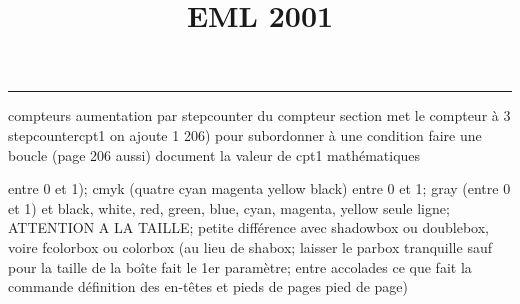 \documentclass[11pt]{article}%
\title{\bf \vspace{-2cm} EML 2001} %
\author{} %
\date{} %
\renewcommand{\headrulewidth}{0pt}%
\renewcommand{\footrulewidth}{0.4pt}%
\begin{document}
\maketitle %
\vspace{-1.4cm}\hrule %
\thispagestyle{fancy}

\vspace*{.2cm}



compteurs%
aumentation par stepcounter du compteur section%
met le compteur à 3%
stepcounter{cpt1} on ajoute 1%
206) pour subordonner à une condition %
faire une boucle (page 206 aussi) %
document la valeur de cpt1 
mathématiques\newcommand{\ch}{\operatorname{ch}} 
\newcommand{\sh}{\operatorname{sh}}
\renewcommand{\tanh}{\operatorname{th}}
\renewcommand{\sinh}{\operatorname{sh}}
\renewcommand{\cosh}{\operatorname{ch}}
\newcommand{\argsh}{\operatorname{argsh}}
\newcommand{\argch}{\operatorname{argch}}
\newcommand{\argth}{\operatorname{argth}}
\newcommand{\ker}{\operatorname{Ker}}
\renewcommand{\im}{\operatorname{Im}}
\newcommand{\rg}{\operatorname{rg}}
\newcommand{\Id}{\operatorname{Id}}
\newcommand{\id}{\operatorname{id}}
\renewcommand{\leq}{\leq}
\renewcommand{\geq}{\geq }

entre 0 et 1); cmyk (quatre cyan magenta yellow black) entre 0 et 1;
gray (entre 0 et 1) et black, white, red, green, blue, cyan, magenta,
yellow%
seule ligne; ATTENTION A LA TAILLE; petite différence avec shadowbox ou
doublebox, voire fcolorbox ou colorbox (au lieu de shabox; laisser le
parbox tranquille sauf pour la taille de la boîte
\newcommand{\Tbox}[1]{\begin{center} \shabox{\parbox{0.6
\linewidth}{#1}} \end{center}} %
fait le 1er paramètre; entre accolades ce que fait la commande
définition des en-têtes et pieds de pages\pagestyle{fancy}
\chead{}
\rfoot[ \ \thepage]{\thepage}
\cfoot{}
\lfoot{}
\thispagestyle{fancy} %
pied de page)\renewcommand{\footrulewidth}{0.4pt}
\renewcommand{\headrulewidth}{0.4pt}
\end{document}
